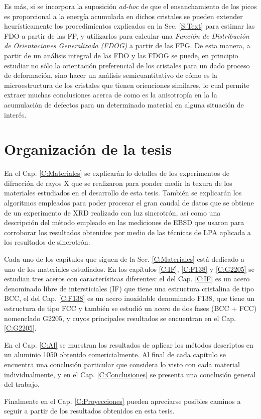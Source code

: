 Es más, si se incorpora la suposición \textit{ad-hoc} de que el ensanchamiento de los picos es proporcional a la energía acumulada en dichos cristales se pueden extender heurísticamente los procedimientos explicados en la Sec. \ref{S:Text} para estimar las FDO a partir de las FP, y utilizarlos para calcular una \textit{Función de Distribución de Orientaciones Generalizada (FDOG)} a partir de las FPG. 
De esta manera, a partir de un análisis integral de las FDO y las FDOG se puede, en principio estudiar no sólo la orientación preferencial de los cristales para un dado proceso de deformación, sino hacer un análisis semicuantitativo de cómo es la microestructura de los cristales que tienen orienciones similares, lo cual permite extraer muchas conclusiones acerca de como es la anisotropía en la la acumulación de defectos para un determinado material en alguna situación de interés. 
 
\section{Organización de la tesis}\label{S:Org}
En el Cap. \ref{C:Materiales} se explicarán lo detalles de los experimentos de difracción de rayos X que se realizaron para ponder medir la texura de los materiales estudiados en el desarrollo de esta tesis. 
También se explicarán los algoritmos empleados para poder procesar el gran caudal de datos que se obtiene de un experimento de XRD realizado con luz sincrotrón, así como una descripción del método empleado en las mediciones de EBSD que usaron para corroborar los resultados obtenidos por medio de las técnicas de LPA aplicada a los resultados de sincrotrón.

Cada uno de los capítulos que siguen de la Sec. \ref{C:Materiales} está dedicado a uno de los materiales estudiados.
En los capítulos \ref{C:IF}, \ref{C:F138} y \ref{C:G2205} se estudian tres aceros con caracterísitcas diferentes: el del Cap. \ref{C:IF} es un acero denominado libre de intersticiales (IF) que tiene una estructura cristalina de tipo BCC, el del Cap. \ref{C:F138} es un acero inoxidable denominado F138, que tiene un estructura de tipo FCC y también se estudió un acero de dos fases (BCC + FCC) nomenclado G2205, y cuyos principales resultados se encuentran en el Cap. \ref{C:G2205}.

En el Cap. \ref{C:Al} se muestran los resultados de aplicar los métodos descriptos en un aluminio 1050 obtenido comericialmente.
Al final de cada capítulo se encuentra una conclusión particular que considera lo visto con cada material individualmente, y en el Cap. \ref{C:Conclusiones} se presenta una conclusión general del trabajo.

Finalmente en el Cap. \ref{C:Proyecciones} pueden apreciarse posibles caminos a seguir a partir de los resultados obtenidos en esta tesis.
